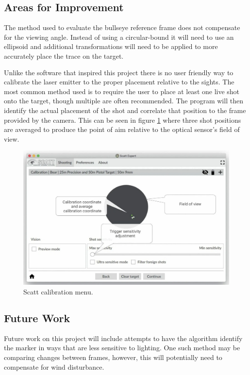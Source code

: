 \documentclass[conference]{IEEEtran}
\begin{document}
\subsection{Areas for Improvement}

The method used to evaluate the bullseye reference frame does not compensate for the viewing angle. Instead of using a circular-bound it will need to use an ellipsoid and additional transformations will need to be applied to more accurately place the trace on the target.

Unlike the software that inspired this project there is no user friendly way to calibrate the laser emitter to the proper placement relative to the sights.
The most common method used is to require the user to place at least one live shot onto the target, though multiple are often recommended.
The program will then identify the actual placement of the shot and correlate that position to the frame provided by the camera.
This can be seen in figure \ref{fig:scatt_calibration} where three shot positions are averaged to produce the point of aim relative to the optical sensor's field of view.

\begin{figure}[]
	\centering
	\includegraphics[width=\linewidth]{scatt_calibration}
	\caption{Scatt \cite{scatt} calibration menu.}
	\label{fig:scatt_calibration}
\end{figure}


\subsection{Future Work}

Future work on this project will include attempts to have the algorithm identify the marker in ways that are less sensitive to lighting.
One such method may be comparing changes between frames,
however, this will potentially need to compensate for wind disturbance.
\end{document}
